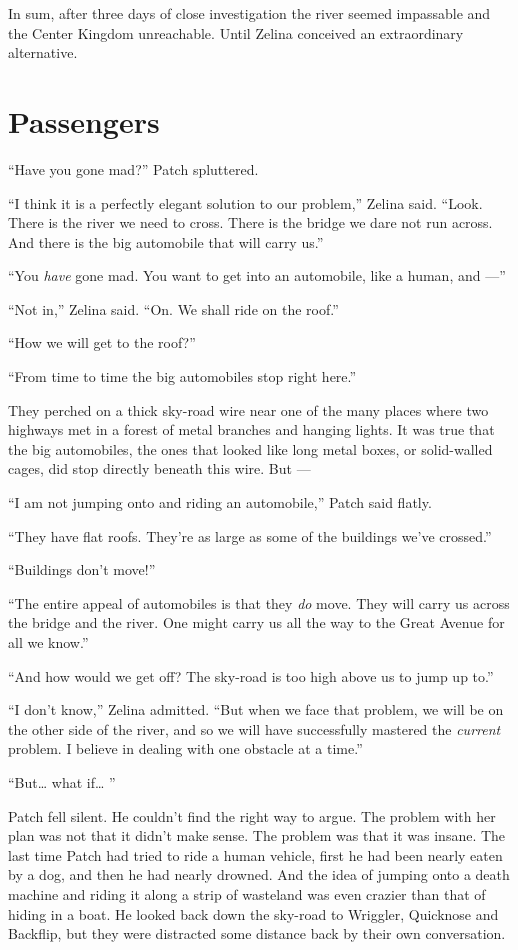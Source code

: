 \documentclass[12pt]{memoir}
\begin{document}
In sum, after three days of close investigation the river seemed
impassable and the Center Kingdom unreachable. Until Zelina conceived
an extraordinary alternative.


\section{Passengers}

“Have you gone mad?” Patch spluttered.

“I think it is a perfectly elegant solution to our problem,” Zelina
said. “Look. There is the river we need to cross. There is the bridge
we dare not run across. And there is the big automobile that will
carry us.”

“You \textit{have} gone mad. You want to get into an automobile, like
a human, and —”

“Not in,” Zelina said. “On. We shall ride on the roof.”

“How we will get to the roof?”

“From time to time the big automobiles stop right here.”

They perched on a thick sky-road wire near one of the many places
where two highways met in a forest of metal branches and hanging
lights. It was true that the big automobiles, the ones that looked
like long metal boxes, or solid-walled cages, did stop directly
beneath this wire. But —

“I am not jumping onto and riding an automobile,” Patch said flatly.

“They have flat roofs. They’re as large as some of the buildings we’ve
crossed.”

“Buildings don’t move!”

“The entire appeal of automobiles is that they \textit{do} move. They
will carry us across the bridge and the river. One might carry us all
the way to the Great Avenue for all we know.”

“And how would we get off? The sky-road is too high above us to jump
up to.”

“I don’t know,” Zelina admitted. “But when we face that problem, we
will be on the other side of the river, and so we will have
successfully mastered the \textit{current} problem. I believe in
dealing with one obstacle at a time.”

“But… what if… ”

Patch fell silent. He couldn’t find the right way to argue. The
problem with her plan was not that it didn’t make sense. The problem
was that it was insane. The last time Patch had tried to ride a human
vehicle, first he had been nearly eaten by a dog, and then he had
nearly drowned. And the idea of jumping onto a death machine and
riding it along a strip of wasteland was even crazier than that of
hiding in a boat. He looked back down the sky-road to Wriggler,
Quicknose and Backflip, but they were distracted some distance back by
their own conversation.
\end{document}
